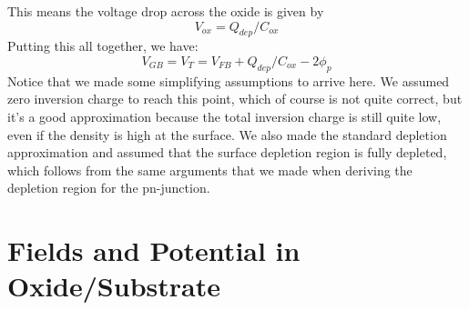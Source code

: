 This means the voltage drop across the oxide is given by
    \begin{equation}
        V_{ox} = Q_{dep} / C_{ox} 
    \end{equation}
Putting this all together, we have:
    \begin{equation}
        V_{GB} = V_T = V_{FB} + Q_{dep}/C_{ox} - 2 \phi_p
    \end{equation}
Notice that we made some simplifying assumptions to arrive here.  We assumed zero inversion charge to reach this point, which of course is not quite correct, but it's a good approximation because the total inversion charge is still quite low, even if the density is high at the surface.  We also made the standard depletion approximation and assumed that the surface depletion region is fully depleted, which follows from the same arguments that we made when deriving the depletion region for the pn-junction.
\section{Fields and Potential in Oxide/Substrate}
